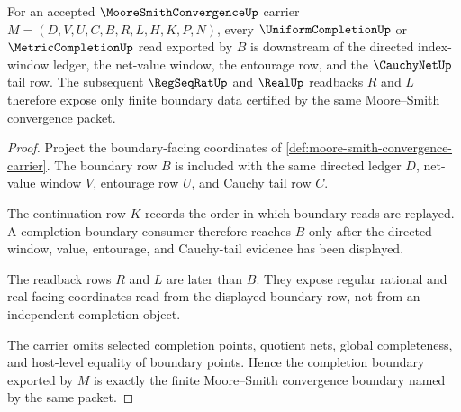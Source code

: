\begin{theorem}
\label{thm:moore-smith-convergence-completion-boundary}
For an accepted $\MooreSmithConvergenceUp$ carrier $M=(D,V,U,C,B,R,L,H,K,P,N)$, every $\UniformCompletionUp$ or $\MetricCompletionUp$ read exported by $B$ is downstream of the directed index-window ledger, the net-value window, the entourage row, and the $\CauchyNetUp$ tail row. The subsequent $\RegSeqRatUp$ and $\RealUp$ readbacks $R$ and $L$ therefore expose only finite boundary data certified by the same Moore--Smith convergence packet.
\end{theorem}
\begin{proof}
Project the boundary-facing coordinates of \autoref{def:moore-smith-convergence-carrier}. The boundary row $B$ is included with the same directed ledger $D$, net-value window $V$, entourage row $U$, and Cauchy tail row $C$.

The continuation row $K$ records the order in which boundary reads are replayed. A completion-boundary consumer therefore reaches $B$ only after the directed window, value, entourage, and Cauchy-tail evidence has been displayed.

The readback rows $R$ and $L$ are later than $B$. They expose regular rational and real-facing coordinates read from the displayed boundary row, not from an independent completion object.

The carrier omits selected completion points, quotient nets, global completeness, and host-level equality of boundary points. Hence the completion boundary exported by $M$ is exactly the finite Moore--Smith convergence boundary named by the same packet.
\end{proof}

